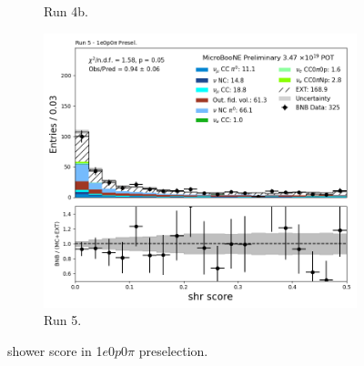 \begin{figure}[H]
\begin{subfigure}[t]{0.32\linewidth}
        \caption{Run 4b.}
    \end{subfigure}%
    \hspace{0.2cm}%
    \begin{subfigure}[t]{0.32\linewidth}
        \includegraphics[width=\linewidth]{technote/Appendix_Preselection/Figures/1e0p0pi/Run5/shr_score_Run5_1e0p0pi_Presel.png}
        \caption{Run 5.}
    \end{subfigure}
    \caption{shower score in 1$e$0$p$0$\pi$ preselection.}
\end{figure}

